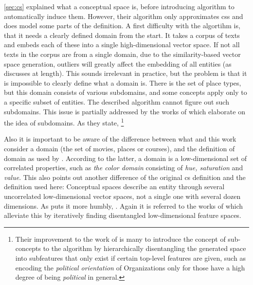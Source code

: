 \autoref{sec:cs} explained what a conceptual space is, before introducing  algorithm to automatically induce them. However, their algorithm only approximates \glspl{cs} and does model some parts of the definition. A first difficulty with the algortihm is, that it needs a clearly defined domain from the start. It takes a corpus of texts and embeds each of these into a single high-dimensional vector space. If not all texts in the corpus are from a single domain, due to the similarity-based vector space generation, outliers will greatly affect the embedding of all entities (as \cite{Ager2018} discusses at length). This sounds irrelevant in practice, but the problem is that it is impossible to clearly define what a domain is. There is the set of place types, but this domain consists of various subdomains, and some concepts apply only to a specific subset of entities. The described algorithm cannot figure out such subdomains. This issue is partially addressed by the works of \textcite{Alshaikh2019, Alshaikh2020, Alshaikh2021} which elaborate on the idea of subdomains. As they state, \textit{} \cite{Alshaikh2020}\footnote{Their improvement to the work of \textcite{Derrac2015} is many to introduce the concept of sub-concepts to the algorithm by hierarchically disentangling the generated space into subfeatures that only exist if certain top-level features are given, such as encoding the \textit{political orientation} of Organizations only for those have a high degree of being \textit{political} in general.} 

Also it is important to be aware of the difference between what \mainalgos and this work consider a domain (the set of movies, places or courses), and the definition of domain as used by \textcite{Gardenfors2000a}. According to the latter, a domain is a low-dimensional set of correlated properties, such as \textit{the color domain} consisting of \textit{hue, saturation} and \textit{value}. This also points out another difference of the original \gls{cs} definition and the definition used here: Conceptual spaces describe an entity through several uncorrelated low-dimensional vector spaces, not a single one with several dozen dimensions. As \cite{Ager2018} puts it more humbly, \textit{}. Again it is referred to the works of \textcite{Alshaikh2019, Alshaikh2020, Alshaikh2021} which alleviate this by iteratively finding disentangled low-dimensional feature spaces.

